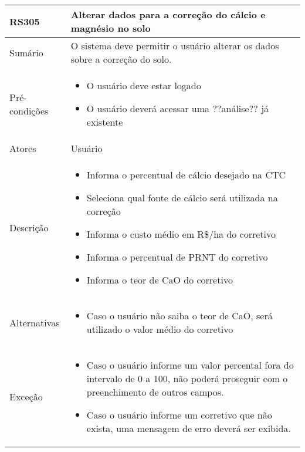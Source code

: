 \begin{quadro}[H]
    \begin{tabular}{|p{3cm}|p{11cm}|}
        \hline
        \textbf{RS305} & \textbf{Alterar dados para a correção do cálcio e magnésio no solo}          \\
        \hline
        Sumário        & O sistema deve permitir o usuário alterar os dados sobre a correção do solo. \\
        \hline
        Pré-condições  & \begin{itemize}
            \item O usuário deve estar logado
            \item O usuário deverá acessar uma ??análise?? já existente
        \end{itemize}                                                   \\
        \hline
        Atores         & Usuário                                                                      \\
        \hline
        Descrição      &
        \begin{itemize}
            \item Informa o percentual de cálcio desejado na CTC
            \item Seleciona qual fonte de cálcio será utilizada na correção
            \item Informa o custo médio em R\$/ha do corretivo
            \item Informa o percentual de PRNT do corretivo
            \item Informa o teor de CaO do corretivo
        \end{itemize}                                                                    \\
        \hline
        Alternativas   &
        \begin{itemize}
            \item Caso o usuário não saiba o teor de CaO, será utilizado o valor médio do corretivo
        \end{itemize}                                                                    \\
        \hline
        Exceção        &
        \begin{itemize}
            \item Caso o usuário informe um valor percental fora do intervalo de 0 a 100, não poderá proseguir com o preenchimento de outros campos.
            \item Caso o usuário informe um corretivo que não exista, uma mensagem de erro deverá ser exibida.
        \end{itemize}                                                                    \\
        \hline
    \end{tabular}
\end{quadro}


